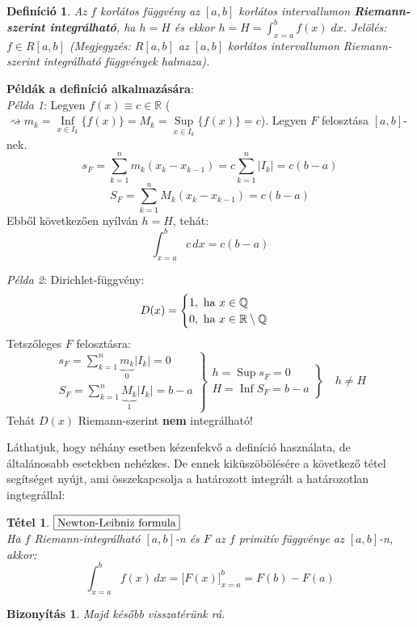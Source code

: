 \documentclass[a4paper,12pt,twoside]{book}
\DeclareMathOperator{\Inf}{Inf}
\DeclareMathOperator{\Sup}{Sup}
\newtheorem{tetel}{Tétel}[chapter]
\newtheorem{defi}{Definíció}[chapter]
\theoremstyle{break}
\newtheorem{biz}{Bizonyítás}[chapter]
\theoremstyle{plain}
\newcommand{\hatInteg}[3]{\ensuremath{\int^{#2}_{x=#1} #3\, dx}}
\begin{document}
\begin{defi}
 Az $f$ korlátos függvény az $[a,b]$ korlátos intervallumon \textbf{Riemann-szerint integrálható}, ha $h=H$ és ekkor $h = H = \displaystyle \int^{b}_{x=a} f(x)\; dx$. Jelölés: $f\in R[a,b]$ (Megjegyzés: $R[a,b]$ az $[a,b]$ korlátos intervallumon Riemann-szerint integrálható függvények halmaza).
\end{defi}

\textbf{Példák a definíció alkalmazására}:\\

\emph{Példa 1}: Legyen $f(x)\equiv c\in\mathbb{R}$ ($\rightsquigarrow m_k = \underset{x\in I_k}{\Inf}\big\{f(x)\big\} = M_k = \underset{x\in I_k}{\Sup}\big\{f(x)\big\}=c$). Legyen $F$ felosztása $[a,b]$-nek.
\[s_F = \sum^{n}_{k=1} m_k(x_k-x_{k-1})= c\sum^{n}_{k=1} |I_k| = c(b-a)\]
\[S_F = \sum^{n}_{k=1} M_k(x_k-x_{k-1})=c(b-a)\]
Ebből következően nyílván $h=H$, tehát:
\[\hatInteg{a}{b}{c} = c(b-a)\]

\emph{Példa 2}: Dirichlet-függvény:
\[D(x) = \begin{cases}1, \hbox{ ha } x\in \mathbb{Q}\\ 0, \hbox{ ha }x\in \mathbb{R}\setminus\mathbb{Q}\end{cases}\]
Tetszőleges $F$ felosztásra:
\[\left.\begin{array}{r}
    s_F = \displaystyle\sum^{n}_{k=1} \underbrace{m_k}_{0}|I_k| = 0\\
    S_F = \displaystyle\sum^{n}_{k=1} \underbrace{M_k}_{1}|I_k| = b-a
   \end{array}\right\} \left.\begin{array}{l}
    h = \Sup s_F = 0\\
    H = \Inf S_F = b-a
   \end{array}\right\} \quad h \neq H\]
Tehát $D(x)$ Riemann-szerint \textbf{nem} integrálható!

Láthatjuk, hogy néhány esetben kézenfekvő a definíció használata, de általánosabb esetekben nehézkes. De ennek kiküszöbölésére a következő tétel segítséget nyújt, ami összekapcsolja a határozott integrált a határozotlan ingtegrállal:

\begin{tetel} $\boxed{$Newton-Leibniz formula$}$\\[+2pt]
 Ha $f$ Riemann-integrálható $[a,b]$-n és $F$ az $f$ primitív függvénye az $[a,b]$-n, akkor:
  \[\hatInteg{a}{b}{f(x)} = \Big[F(x)\Big]^{b}_{x=a} = F(b)-F(a)\]
\end{tetel}
\begin{biz}
 Majd később visszatérünk rá.
\end{biz}
\end{document}
